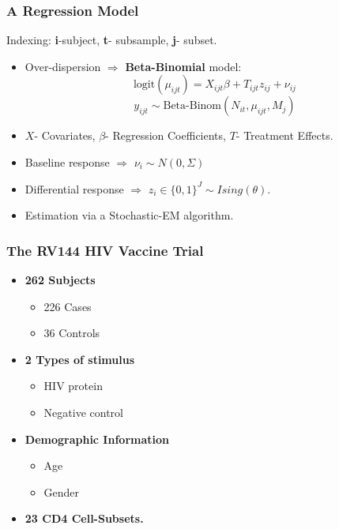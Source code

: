 \documentclass{beamer}
\theoremstyle{definition}
\begin{document}

\begin{frame}
\frametitle{A Regression Model}
\begin{framed}
Indexing: \textbf{i}-subject, \textbf{t}- subsample, \textbf{j}- subset.
\end{framed}
\begin{itemize}
\item Over-dispersion $\Rightarrow$ \textbf{Beta-Binomial} model: 
$$
\text{logit}(\mu_{ijt}) = X_{ijt}\beta + T_{ijt} z_{ij} + \nu_{ij}
$$$$
y_{ijt} \sim \text{Beta-Binom}(N_{it}, \mu_{ijt}, M_{j})
$$

\vspace{0.5 cm}
\item $X$- Covariates, $\beta$- Regression Coefficients, $T$- Treatment Effects.

\vspace{0.5 cm}
\item Baseline response $\Rightarrow$ $\nu_i \sim N(0, \Sigma)$ 

\vspace{0.5 cm}
\item Differential response $\Rightarrow$ $z_i \in \{0,1\}^{J} \sim Ising(\theta)$.  

\pause
\vspace{0.5 cm}
\item Estimation via a Stochastic-EM algorithm.   
\end{itemize}
\end{frame}


\begin{frame}
\frametitle{The RV144 HIV Vaccine Trial}
\begin{itemize}
\item \textbf{262 Subjects}
	\begin{itemize}
	\item 226 Cases
	\item 36 Controls
	\end{itemize}
\vspace{0.5 cm}

\item \textbf{2 Types of stimulus} 
	\begin{itemize}
	\item HIV protein
	\item Negative control
	\end{itemize}
\vspace{0.5 cm}

\item \textbf{Demographic Information}
	\begin{itemize}
	\item Age
	\item Gender 
	\end{itemize}
\vspace{0.5 cm}

\item \textbf{23 CD4 Cell-Subsets.} 
\end{itemize}
\end{frame}
\end{document}
